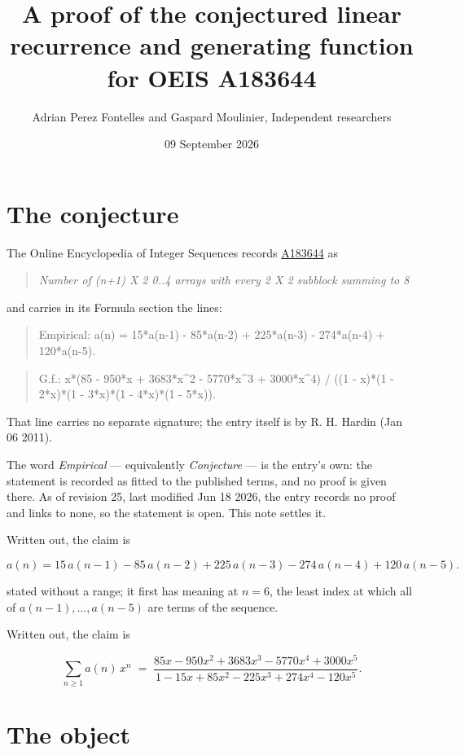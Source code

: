\documentclass[11pt]{article}
\title{A proof of the conjectured linear recurrence and generating function for OEIS A183644}
\author{Adrian Perez Fontelles and Gaspard Moulinier, Independent researchers}
\date{09 September 2026}
\theoremstyle{definition}
\begin{document}
\maketitle
\section{The conjecture}

The Online Encyclopedia of Integer Sequences records \href{https://oeis.org/A183644}{A183644} as

\begin{quote}\itshape Number of (n+1) X 2 0..4 arrays with every 2 X 2 subblock summing to 8\end{quote}

and carries in its Formula section the lines:

\begin{quote}\ttfamily Empirical: a(n) = 15*a(n-1) - 85*a(n-2) + 225*a(n-3) - 274*a(n-4) + 120*a(n-5).\end{quote}

\begin{quote}\ttfamily G.f.: x*(85 - 950*x + 3683*x\textasciicircum{}2 - 5770*x\textasciicircum{}3 + 3000*x\textasciicircum{}4) / ((1 - x)*(1 - 2*x)*(1 - 3*x)*(1 - 4*x)*(1 - 5*x)).\end{quote}

That line carries no separate signature; the entry itself is by R. H. Hardin (Jan 06 2011).

The word {\itshape Empirical} --- equivalently {\itshape Conjecture} --- is the entry's own: the statement is recorded as fitted to the published terms, and no proof is given there. As of revision 25, last modified Jun 18 2026, the entry records no proof and links to none, so the statement is open. This note settles it.

Written out, the claim is

\[a(n) = 15\,a(n-1) - 85\,a(n-2) + 225\,a(n-3) - 274\,a(n-4) + 120\,a(n-5).\]

stated without a range; it first has meaning at $n = 6$, the least index at which all of $a(n-1),\dots,a(n-5)$ are terms of the sequence.

Written out, the claim is

\[\sum_{n \ge 1} a(n)\,x^n \;=\; \frac{85x - 950x^{2} + 3683x^{3} - 5770x^{4} + 3000x^{5}}{1 - 15x + 85x^{2} - 225x^{3} + 274x^{4} - 120x^{5}}.\]

\section{The object}
\end{document}
